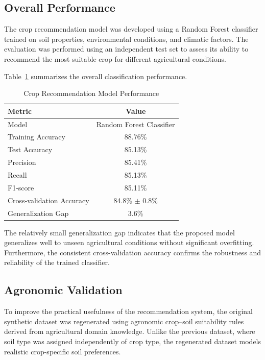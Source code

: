 \subsection{Overall Performance}

The crop recommendation model was developed using a Random Forest classifier trained on soil properties, environmental conditions, and climatic factors. The evaluation was performed using an independent test set to assess its ability to recommend the most suitable crop for different agricultural conditions.

Table~\ref{tab:crop_metrics} summarizes the overall classification performance.

\begin{table}[H]
\centering
\caption{Crop Recommendation Model Performance}
\label{tab:crop_metrics}
\renewcommand{\arraystretch}{1.4}
\begin{tabular}{lc}
\toprule
\textbf{Metric} & \textbf{Value} \\
\midrule
Model & Random Forest Classifier \\
Training Accuracy & 88.76\% \\
Test Accuracy & 85.13\% \\
Precision & 85.41\% \\
Recall & 85.13\% \\
F1-score & 85.11\% \\
Cross-validation Accuracy & 84.8\% $\pm$ 0.8\% \\
Generalization Gap & 3.6\% \\
\bottomrule
\end{tabular}
\end{table}

The relatively small generalization gap indicates that the proposed model generalizes well to unseen agricultural conditions without significant overfitting. Furthermore, the consistent cross-validation accuracy confirms the robustness and reliability of the trained classifier.

\subsection{Agronomic Validation}

To improve the practical usefulness of the recommendation system, the original synthetic dataset was regenerated using agronomic crop--soil suitability rules derived from agricultural domain knowledge. Unlike the previous dataset, where soil type was assigned independently of crop type, the regenerated dataset models realistic crop-specific soil preferences.

